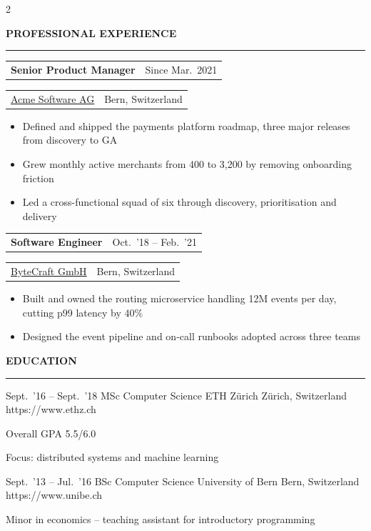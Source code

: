 \documentclass[a4paper,11pt]{article}
\makeatletter
\newlength{\sidebarW}
\newlength{\entryRowGap}          %
\newlength{\entryBottomGap}       %
\newlength{\entryGap}             %
\newlength{\sectionGap}           %
\newlength{\sectionRuleGap}       %
\newlength{\sectionBodyGap}       %
\newcommand{\mainSection}[2][\relax]{%
  \noindent\Large\textbf{%
    \ifx#1\relax\else{\normalsize\color{black}#1\hspace{5pt}}\fi%
    #2%
  }\par\vspace{\sectionRuleGap}%
  \noindent\rule{\linewidth}{0.5pt}\par\vspace{\sectionBodyGap}%
}
\newenvironment{experience}[5]{%
  \noindent\begin{tabular*}{\linewidth}{@{}l@{\extracolsep{\fill}}r@{}}
    {\large\textbf{#2}} & {\small\color{SubtleGray}#1}%
  \end{tabular*}\par\vspace{\entryRowGap}%
  \noindent\begin{tabular*}{\linewidth}{@{}l@{\extracolsep{\fill}}r@{}}
    {\small\href{#5}{\color{CompanyColor}\ul{#3}}} & {\small\color{LocationColor}#4}%
  \end{tabular*}\par\vspace{\entryBottomGap}%
  \begin{itemize}[%
    leftmargin=1.2em,%
    label={\small$\cdot$},%
    itemsep=2pt,%
    parsep=0pt,%
    topsep=0pt,%
    partopsep=0pt%
  ]\small%
}{%
  \end{itemize}\vspace{\entryGap}%
}
\makeatother
\begin{document}
\begin{paracol}{2}
\begin{minipage}[t]{\dimexpr\paperwidth-\sidebarW-22pt\relax}
    \mainSection[\faBriefcase]{PROFESSIONAL EXPERIENCE}

    \begin{experience}{Since Mar.~2021}%
                      {Senior Product Manager}%
                      {Acme Software AG}%
                      {Bern, Switzerland}%
                      {https://www.example.com}
      \item Defined and shipped the payments platform roadmap, three major releases from discovery to GA
      \item Grew monthly active merchants from 400 to 3,200 by removing onboarding friction
      \item Led a cross-functional squad of six through discovery, prioritisation and delivery
    \end{experience}

    \begin{experience}{Oct.~'18 -- Feb.~'21}%
                      {Software Engineer}%
                      {ByteCraft GmbH}%
                      {Bern, Switzerland}%
                      {https://www.example.com}
      \item Built and owned the routing microservice handling 12M events per day, cutting p99 latency by 40\%
      \item Designed the event pipeline and on-call runbooks adopted across three teams
    \end{experience}
    \vspace{\sectionGap}

    \mainSection[\faGraduationCap]{EDUCATION}

    \begin{education}{Sept.~'16 -- Sept.~'18}%
                     {MSc Computer Science}%
                     {ETH Z\"urich}%
                     {Z\"urich, Switzerland}%
                     {https://www.ethz.ch}
      \item Overall GPA 5.5/6.0
      \item Focus: distributed systems and machine learning
    \end{education}

    \begin{education}{Sept.~'13 -- Jul.~'16}%
                     {BSc Computer Science}%
                     {University of Bern}%
                     {Bern, Switzerland}%
                     {https://www.unibe.ch}
      \item Minor in economics -- teaching assistant for introductory programming
    \end{education}


\end{minipage}
\end{paracol}
\end{document}
